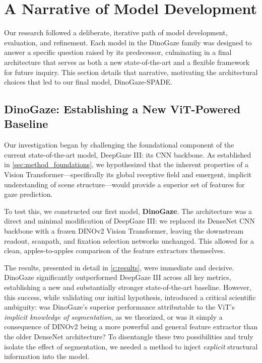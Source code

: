 \section{A Narrative of Model Development}
\label{sec:method_narrative_development}

Our research followed a deliberate, iterative path of model development, evaluation, and refinement. Each model in the DinoGaze family was designed to answer a specific question raised by its predecessor, culminating in a final architecture that serves as both a new state-of-the-art and a flexible framework for future inquiry. This section details that narrative, motivating the architectural choices that led to our final model, DinoGaze-SPADE.

\subsection{DinoGaze: Establishing a New ViT-Powered Baseline}
\label{sec:method_dinogaze_baseline}

Our investigation began by challenging the foundational component of the current state-of-the-art model, DeepGaze III: its CNN backbone. As established in \cref{sec:method_foundations}, we hypothesized that the inherent properties of a Vision Transformer—specifically its global receptive field and emergent, implicit understanding of scene structure—would provide a superior set of features for gaze prediction.

To test this, we constructed our first model, \textbf{DinoGaze}. The architecture was a direct and minimal modification of DeepGaze III: we replaced its DenseNet CNN backbone with a frozen DINOv2 Vision Transformer, leaving the downstream readout, scanpath, and fixation selection networks unchanged. This allowed for a clean, apples-to-apples comparison of the feature extractors themselves.

The results, presented in detail in \cref{c:results}, were immediate and decisive. DinoGaze significantly outperformed DeepGaze III across all key metrics, establishing a new and substantially stronger state-of-the-art baseline. However, this success, while validating our initial hypothesis, introduced a critical scientific ambiguity: was DinoGaze's superior performance attributable to the ViT's \textit{implicit knowledge of segmentation}, as we theorized, or was it simply a consequence of DINOv2 being a more powerful and general feature extractor than the older DenseNet architecture? To disentangle these two possibilities and truly isolate the effect of segmentation, we needed a method to inject \textit{explicit} structural information into the model.

